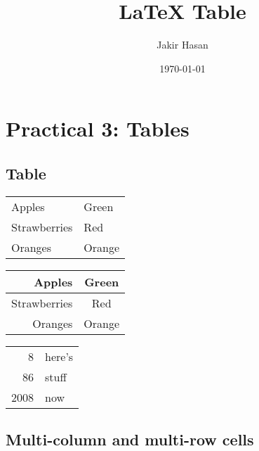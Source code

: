 \documentclass [a4paper, 12pt] {report}
\begin{document}
\title{LaTeX Table}
\author{Jakir Hasan}
\date{\today}
\maketitle

\tableofcontents
\listoftables
\newpage
{}

\setcounter{chapter}{1}
\chapter*{Practical 3: Tables}

\section{Table}

\begin{tabular}{ | l | l | }
Apples & Green \\
Strawberries & Red \\
Oranges & Orange \\

\end{tabular}

\vspace{15mm}

\begin{tabular} {r c }

Apples & Green \\
\hline
Strawberries & Red \\
\cline{1-1}
Oranges & Orange \\

\end{tabular}

\vspace{15mm}

\begin{tabular} {| r | l | }

\hline
8 & here's \\
\cline{2-2}
86 & stuff \\
\hline
\hline
2008 & now \\
\hline

\end{tabular}

\vspace{15mm}

\section {Multi-column and multi-row cells}
\end{document}
